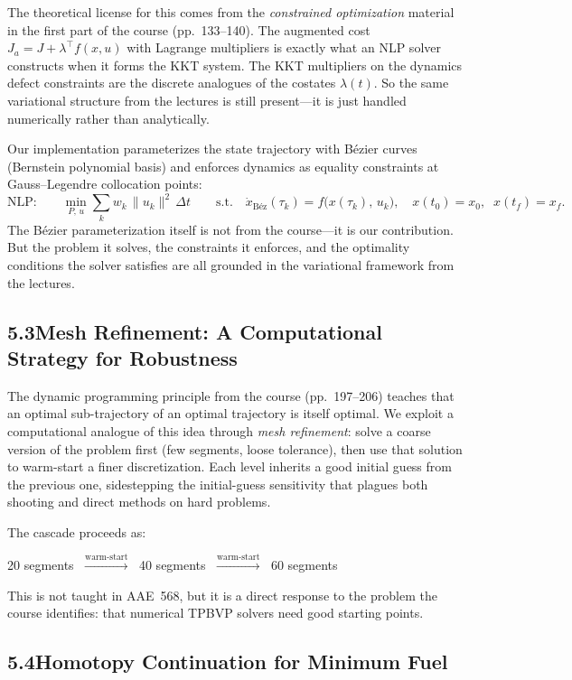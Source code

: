 \documentclass[11pt,letterpaper]{article}
\begin{document}
The theoretical license for this comes from the \emph{constrained optimization} material in the first part of the course (pp.~133--140). The augmented cost $J_a = J + \lambda^\top f(x,u)$ with Lagrange multipliers is exactly what an NLP solver constructs when it forms the KKT system. The KKT multipliers on the dynamics defect constraints are the discrete analogues of the costates $\lambda(t)$. So the same variational structure from the lectures is still present---it is just handled numerically rather than analytically.

Our implementation parameterizes the state trajectory with B\'ezier curves (Bernstein polynomial basis) and enforces dynamics as equality constraints at Gauss--Legendre collocation points:
\[
  \text{NLP:}\qquad
  \min_{P,\,u} \sum_k w_k\,\|u_k\|^2\,\Delta t
  \qquad\text{s.t.}\quad
  \dot{x}_{\text{B\'ez}}(\tau_k) = f\bigl(x(\tau_k),\, u_k\bigr),
  \quad
  x(t_0) = x_0,\;\; x(t_f) = x_f.
\]
The B\'ezier parameterization itself is not from the course---it is our contribution. But the problem it solves, the constraints it enforces, and the optimality conditions the solver satisfies are all grounded in the variational framework from the lectures.


\subsection{5.3\quad Mesh Refinement: A Computational Strategy for Robustness}

The dynamic programming principle from the course (pp.~197--206) teaches that an optimal sub-trajectory of an optimal trajectory is itself optimal. We exploit a computational analogue of this idea through \emph{mesh refinement}: solve a coarse version of the problem first (few segments, loose tolerance), then use that solution to warm-start a finer discretization. Each level inherits a good initial guess from the previous one, sidestepping the initial-guess sensitivity that plagues both shooting and direct methods on hard problems.

The cascade proceeds as:
\begin{center}
\small
20 segments $\;\xrightarrow{\text{warm-start}}\;$ 40 segments $\;\xrightarrow{\text{warm-start}}\;$ 60 segments
\end{center}
This is not taught in AAE~568, but it is a direct response to the problem the course identifies: that numerical TPBVP solvers need good starting points.


\subsection{5.4\quad Homotopy Continuation for Minimum Fuel}
\end{document}
